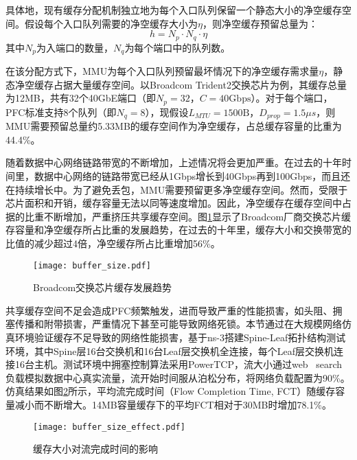 具体地，现有缓存分配机制独立地为每个入口队列保留一个静态大小的净空缓存空间。假设每个入口队列需要的净空缓存大小为$\eta$，则净空缓存预留总量为：
\begin{equation}
  h = N_p \cdot N_q \cdot \eta
  \label{eqn:c3:total headroom}
\end{equation}
\noindent 其中$N_p$为入端口的数量，$N_q$为每个端口中的队列数。

在该分配方式下，MMU为每个入口队列预留最坏情况下的净空缓存需求量$\eta$，静态净空缓存占据大量缓存空间。以Broadcom Trident2交换芯片为例，其缓存总量为12MB，共有32个40GbE端口（即$N_p=32$，$C=40\text{Gbps}$）。对于每个端口，PFC标准支持8个队列（即$N_q=8$），现假设$L_{MTU}=\text{1500B}$，$D_{prop}=1.5μs$，则MMU需要预留总量约5.33MB的缓存空间作为净空缓存，占总缓存容量的比重为44.4\%。

随着数据中心网络链路带宽的不断增加，上述情况将会更加严重。在过去的十年时间里，数据中心网络的链路带宽已经从1Gbps增长到40Gbps再到100Gbps\cite{SIGCOMM19HPCC,SIGCOMM15Jupiter}，而且还在持续增长中。为了避免丢包，MMU需要预留更多净空缓存空间。然而，受限于芯片面积和开销，缓存容量无法以同等速度增加\cite{INFOCOM20BCC,ICNP21FlashPass,NSDI22BFC}。因此，净空缓存在缓存空间中占据的比重不断增加，严重挤压共享缓存空间。图\ref{c3:s2:ss1:fig:broadcom asic buffer size}显示了Broadcom厂商交换芯片缓存容量和净空缓存所占比重的发展趋势，在过去的十年里，缓存大小和交换带宽的比值的减少超过4倍，净空缓存所占比重增加56\%。

\begin{figure}[H]
  \centering
  \texttt{[image: buffer\_size.pdf]}
  \caption{Broadcom交换芯片缓存发展趋势}
  \label{c3:s2:ss1:fig:broadcom asic buffer size}
\end{figure}

共享缓存空间不足会造成PFC频繁触发，进而导致严重的性能损害，如头阻、拥塞传播和附带损害，严重情况下甚至可能导致网络死锁。本节通过在大规模网络仿真环境验证缓存不足导致的网络性能损害，基于ns-3搭建Spine-Leaf拓扑结构测试环境，其中Spine层16台交换机和16台Leaf层交换机全连接，每个Leaf层交换机连接16台主机。测试环境中拥塞控制算法采用PowerTCP\cite{NSDI22PowerTCP}，流大小通过web \ search负载\cite{SIGCOMM10DCTCP}模拟数据中心真实流量，流开始时间服从泊松分布，将网络负载配置为90\%。仿真结果如图\ref{c3:s2:ss1:fig:buffer size effect}所示，平均流完成时间（Flow Completion Time, FCT）随缓存容量减小而不断增大。14MB容量缓存下的平均FCT相对于30MB时增加78.1\%。

\begin{figure}[H]
  \centering
  \texttt{[image: buffer\_size\_effect.pdf]}
  \caption{缓存大小对流完成时间的影响}
  \label{c3:s2:ss1:fig:buffer size effect}
\end{figure}


